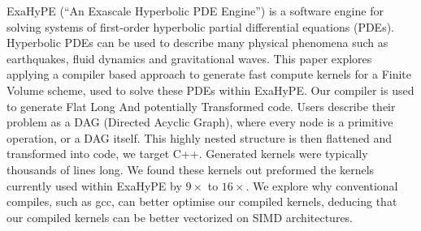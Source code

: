 ExaHyPE (``An Exascale Hyperbolic PDE Engine'') is a software engine for solving systems of first-order hyperbolic partial differential equations (PDEs).
Hyperbolic PDEs can be used to describe many physical phenomena such as earthquakes, fluid dynamics and gravitational waves.
This paper explores applying a compiler based approach to generate fast compute kernels for a Finite Volume scheme, used to solve these PDEs within ExaHyPE.
Our compiler \phlat is used to generate Flat Long And potentially Transformed code.
Users describe their problem as a DAG (Directed Acyclic Graph), where every node is a primitive operation, or a DAG itself.
This highly nested structure is then flattened and transformed into code, we target C++.
Generated kernels were typically thousands of lines long.
We found these kernels out preformed the kernels currently used within ExaHyPE by $9\times$ to $16\times$.
We explore why conventional compiles, such as gcc, can better optimise our compiled kernels, deducing that our compiled kernels can be better vectorized on SIMD architectures. 
